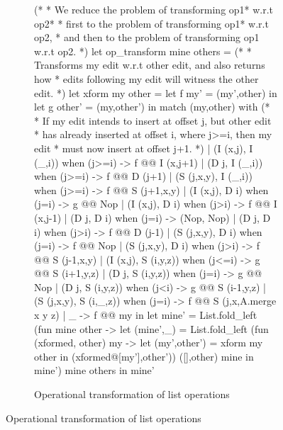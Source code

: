 \begin{figure}
\begin{subfigure}{0.75\textwidth}
\begin{ocaml}
(*
 * We reduce the problem of transforming op1* w.r.t op2* 
 * first to the problem of transforming op1* w.r.t op2,
 * and then to the problem of transforming op1 w.r.t op2.
*)
let op_transform mine others = 
  (*
   * Transforms my edit w.r.t other edit, and also returns how 
   * edits following my edit will witness the other edit.
   *)
  let xform my other = 
    let f my' = (my',other) in
    let g other' = (my,other') in
      match (my,other)  with 
        (*
         * If my edit intends to insert at offset j, but other edit 
         * has already inserted at offset i, where j>=i, then my edit 
         * must now insert at offset j+1. 
         *)
      | (I (x,j), I (_,i)) when (j>=i) -> f @@ I (x,j+1)
      | (D j, I (_,i)) when (j>=i) -> f @@ D (j+1)
      | (S (j,x,y), I (_,i)) when (j>=i) -> f @@ S (j+1,x,y)
      | (I (x,j), D i) when (j=i) ->  g @@ Nop
      | (I (x,j), D i) when (j>i) ->  f @@ I (x,j-1)
      | (D j, D i) when (j=i) -> (Nop, Nop)
      | (D j, D i) when (j>i) ->  f @@ D (j-1)
      | (S (j,x,y), D i) when (j=i) -> f @@ Nop
      | (S (j,x,y), D i) when (j>i) -> f @@ S (j-1,x,y)
      | (I (x,j), S (i,y,z)) when (j<=i) -> g @@ S (i+1,y,z)
      | (D j, S (i,y,z)) when (j=i) -> g @@ Nop
      | (D j, S (i,y,z)) when (j<i) -> g @@ S (i-1,y,z)
      | (S (j,x,y), S (i,_,z)) when (j=i) -> f @@ S (j,x,A.merge x y z) 
      | _ -> f @@ my in
  let mine' = 
    List.fold_left 
      (fun mine other -> 
         let (mine',_) = 
           List.fold_left 
             (fun (xformed, other) my -> 
                let (my',other') = xform my other in
                  (xformed@[my'],other')) 
             ([],other) mine in
           mine') 
      mine others in
    mine'
\end{ocaml}
\caption{Operational transformation of list operations}
\label{fig:mlist-xform}
\end{subfigure}
\end{figure}
